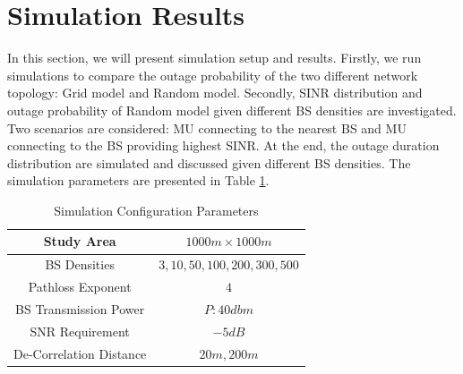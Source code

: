  \section{Simulation Results}
 \label{4:SimuProb}
 \par In this section, we will present simulation setup and results. Firstly, we run simulations to compare the outage probability of the two different network topology: Grid model and Random model. Secondly, SINR distribution and outage probability of Random model given different BS densities are investigated. Two scenarios are considered: MU connecting to the nearest BS and MU connecting to the BS providing highest SINR. At the end, the outage duration distribution are simulated and discussed given different BS densities. The simulation parameters are presented in Table \ref{SystemConfig2}. 
 \begin{table}
 \centering
 \caption{\label{SystemConfig2}Simulation Configuration Parameters}

 \begin{tabular}{|c|c|}

 \hline
 Study Area & $1000m\times 1000m$\\
 \hline
 BS Densities & $3, 10, 50, 100, 200, 300, 500$\\
 \hline
 Pathloss Exponent & $4$\\
 \hline
 BS Transmission Power & $P: 40dbm$\\
 \hline
 SNR Requirement & $-5dB$\\
 \hline
 De-Correlation Distance & $20m, 200m$\\
 \hline
 \end{tabular}

 \end{table}

